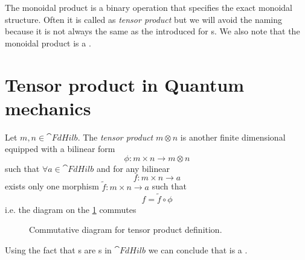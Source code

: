 \begin{remark}
\label{rem:monoidal_product}
The monoidal product is a binary operation that specifies the exact
monoidal structure. Often it is called as \textit{tensor product} but
we will avoid the naming because it is not always the same as the
 introduced for
s. We also note that the monoidal product is
a . 
\end{remark}

\section{Tensor product in Quantum mechanics}

\begin{definition}
  \label{def:tensor_product}
  Let $m,n \in \cat{FdHilb}$. The \textit{tensor product} $m \otimes n$ is another
  finite dimensional  equipped with a
  bilinear form
  \[
  \phi: m \times n \to m \otimes n
  \]
  such that $\forall a \in \cat{FdHilb}$ and for any
  bilinear
  \[
  f: m \times n \to a
  \]
  exists only one morphism $\tilde{f}: m \times n \to a$ such that
  \[
  f = \tilde{f} \circ \phi
  \]
  i.e. the diagram on the \cref{fig:tensor_product} commutes
\begin{figure}[H]
  \centering
  \caption{Commutative diagram for tensor product definition.} 
  \label{fig:tensor_product}
\end{figure}
\end{definition}

\begin{remark}
Using the fact that s are
s in $\cat{FdHilb}$ we can conclude that 
 is a .
\end{remark}

